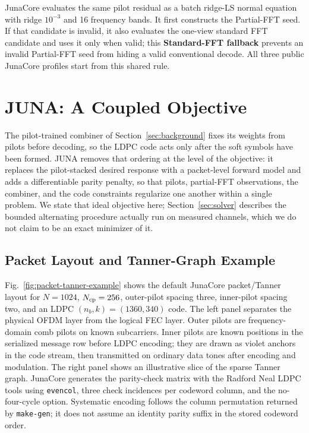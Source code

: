 \documentclass[journal]{IEEEtran}
\newcommand{\juna}{JUNA}
\begin{document}
JunaCore evaluates the same pilot residual as a batch ridge-LS normal equation
with ridge $10^{-3}$ and 16 frequency bands. It first constructs the
Partial-FFT seed. If that candidate is invalid, it also evaluates the one-view
standard FFT candidate and uses it only when valid; this
\textbf{Standard-FFT fallback} prevents an invalid Partial-FFT seed from hiding a valid conventional
decode. All three public JunaCore profiles start from this shared rule.

\section{JUNA: A Coupled Objective}\label{sec:juna}
The pilot-trained combiner of Section~\ref{sec:background} fixes its weights from
pilots before decoding, so the LDPC code acts only after the soft symbols have
been formed. \juna{} removes that ordering at the level of the objective: it
replaces the pilot-stacked desired response with a packet-level forward model and
adds a differentiable parity penalty, so that pilots, partial-FFT observations, the
combiner, and the code constraints regularize one another within a single
problem. We state that ideal objective here; Section~\ref{sec:solver} describes
the bounded alternating procedure actually run on measured channels, which we do
not claim to be an exact minimizer of it.

\subsection{Packet Layout and Tanner-Graph Example}
\label{ssec:packet-tanner-example}
Fig.~\ref{fig:packet-tanner-example} shows the default JunaCore packet/Tanner
layout for $N=1024$, $N_{\rm cp}=256$, outer-pilot spacing three, inner-pilot
spacing two, and an LDPC $(n_b,k)=(1360,340)$ code. The left panel separates
the physical OFDM layer from the logical FEC layer. Outer pilots are
frequency-domain comb pilots on known subcarriers. Inner pilots are known
positions in the serialized message row before LDPC encoding; they are drawn as
violet anchors in the code stream, then transmitted on ordinary data tones after
encoding and modulation. The right panel shows an illustrative slice of the
sparse Tanner graph. JunaCore generates the parity-check matrix with the
Radford Neal LDPC tools using \texttt{evencol}, three check incidences per
codeword column, and the no-four-cycle option. Systematic encoding follows the
column permutation returned by \texttt{make-gen}; it does not assume an
identity parity suffix in the stored codeword order.
\end{document}
